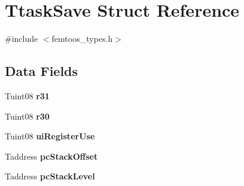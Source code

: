 \hypertarget{struct_ttask_save}{\section{Ttask\-Save Struct Reference}
\label{struct_ttask_save}
}


{\ttfamily \#include $<$femtoos\-\_\-types.\-h$>$}

\subsection*{Data Fields}
\begin{DoxyCompactItemize}
\item 
\hypertarget{struct_ttask_save_a54ea05e0e4c7c1b0146d30fcbf7ae1e4}{Tuint08 {\bfseries r31}}\label{struct_ttask_save_a54ea05e0e4c7c1b0146d30fcbf7ae1e4}

\item 
\hypertarget{struct_ttask_save_a2ebaef46f74af2534781b41bc2d77dc0}{Tuint08 {\bfseries r30}}\label{struct_ttask_save_a2ebaef46f74af2534781b41bc2d77dc0}

\item 
\hypertarget{struct_ttask_save_abfb35c9c2b6dc1d49d32d64bcb20a39e}{Tuint08 {\bfseries ui\-Register\-Use}}\label{struct_ttask_save_abfb35c9c2b6dc1d49d32d64bcb20a39e}

\item 
\hypertarget{struct_ttask_save_aec8e6720833c7c112cecb3cc05fbe390}{Taddress {\bfseries pc\-Stack\-Offset}}\label{struct_ttask_save_aec8e6720833c7c112cecb3cc05fbe390}

\item 
\hypertarget{struct_ttask_save_a13b1aaff58a8b3a0ae39208c79ac7a83}{Taddress {\bfseries pc\-Stack\-Level}}\label{struct_ttask_save_a13b1aaff58a8b3a0ae39208c79ac7a83}

\end{DoxyCompactItemize}


